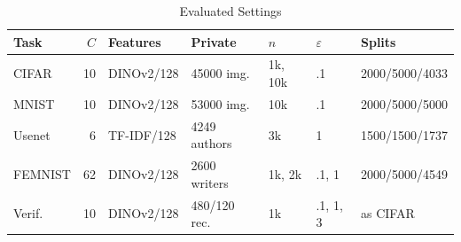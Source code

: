 \begin{table}[t]
\caption{Evaluated Settings}
\label{tab:setup}\small\setlength{\tabcolsep}{2pt}
\centering
\begin{tabular}{@{}lrlllll@{}}\toprule
Task & $C$ & Features & Private & $n$ & $\varepsilon$ & Splits \\
\midrule
CIFAR & 10 & DINOv2/128 & 45000 img. & 1k, 10k & .1 & 2000/5000/4033 \\
MNIST & 10 & DINOv2/128 & 53000 img. & 10k & .1 & 2000/5000/5000 \\
Usenet & 6 & TF-IDF/128 & 4249 authors & 3k & 1 & 1500/1500/1737 \\
FEMNIST & 62 & DINOv2/128 & 2600 writers & 1k, 2k & .1, 1 & 2000/5000/4549 \\
Verif. & 10 & DINOv2/128 & 480/120 rec. & 1k & .1, 1, 3 & as CIFAR \\
\bottomrule\end{tabular}
\end{table}
